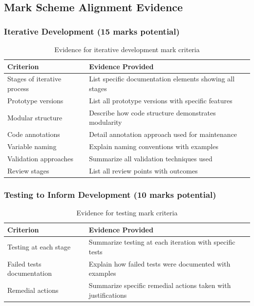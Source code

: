 \clearpage
\subsection{Mark Scheme Alignment Evidence}

\subsubsection{Iterative Development (15 marks potential)}
\begin{table}[htbp]
\centering
\begin{tabularx}{\textwidth}{|l|X|}
\hline
\textbf{Criterion} & \textbf{Evidence Provided} \\
\hline
Stages of iterative process & List specific documentation elements showing all stages \\
\hline
Prototype versions & List all prototype versions with specific features \\
\hline
Modular structure & Describe how code structure demonstrates modularity \\
\hline
Code annotations & Detail annotation approach used for maintenance \\
\hline
Variable naming & Explain naming conventions with examples \\
\hline
Validation approaches & Summarize all validation techniques used \\
\hline
Review stages & List all review points with outcomes \\
\hline
\end{tabularx}
\caption{Evidence for iterative development mark criteria}
\end{table}

\subsubsection{Testing to Inform Development (10 marks potential)}
\begin{table}[htbp]
\centering
\begin{tabularx}{\textwidth}{|l|X|}
\hline
\textbf{Criterion} & \textbf{Evidence Provided} \\
\hline
Testing at each stage & Summarize testing at each iteration with specific tests \\
\hline
Failed tests documentation & Explain how failed tests were documented with examples \\
\hline
Remedial actions & Summarize specific remedial actions taken with justifications \\
\hline
\end{tabularx}
\caption{Evidence for testing mark criteria}
\end{table}

